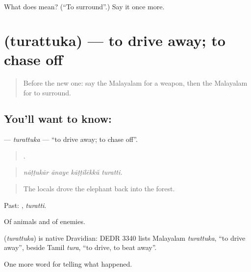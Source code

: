\begin{tcolorbox}[breakable,colback=teal!4,colframe=teal!35!black,title={Before you move on}]
What does  mean? (\textquotedblleft{}To surround\textquotedblright{}.) Say it once more.
\end{tcolorbox}
\section[\texorpdfstring{\ml{തുരത്തുക} (turattuka)}{തുരത്തുക (turattuka)}]{ (turattuka) — to drive away; to chase off}

\label{lesson:ML-C382-turattuka}



\begin{quote}
Before the new one: say the Malayalam for a weapon, then the Malayalam for to surround.
\end{quote}

\subsection*{You'll want to know: }
\textbf{} — \emph{turattuka} — \textquotedblleft{}to drive away; to chase off\textquotedblright{}.

\begin{quote}
   .
\end{quote}

\begin{quote}
\emph{nāṭṭukār ānaye kāṭṭilēkkŭ turatti.}
\end{quote}

\begin{quote}
The locals drove the elephant back into the forest.
\end{quote}

Past: , \emph{turatti}.

Of animals and of enemies.

\begin{cousinweb}
\textbf{} (\emph{turattuka}) is native Dravidian: DEDR 3340 lists Malayalam \emph{turattuka}, \textquotedblleft{}to drive away\textquotedblright{}, beside Tamil \emph{tura}, \textquotedblleft{}to drive, to beat away\textquotedblright{}.
\end{cousinweb}

\begin{grammarlens}[title={What you've built}]
One more word for telling what happened.
\end{grammarlens}

